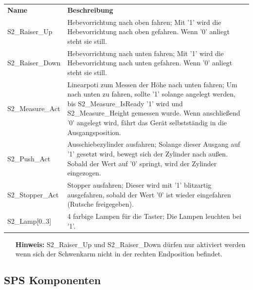 \documentclass[11pt,a4paper,ngerman]{article}
\begin{document}
\begin{center}
	\begin{tabularx}{\textwidth}{|p{4cm}|X|}
		\hline
		\rowcolor{tublau}
		\multicolumn{2}{|c|}{\bf \color{white} \large Aktoren}\\
		\hline\hline
		\rowcolor{gray!80}
		\bf Name & \bf Beschreibung\\
		\hline\hline
		S2\_Raiser\_Up & Hebevorrichtung nach oben fahren; Mit '1' wird die Hebevorrichtung nach oben gefahren. Wenn '0' anliegt steht sie still.\\
		S2\_Raiser\_Down & Hebevorrichtung nach unten fahren; Mit '1' wird die Hebevorrichtung nach unten gefahren. Wenn '0' anliegt steht sie still.\\
		S2\_Measure\_Act & Linearpoti zum Messen der Höhe nach unten fahren; Um nach unten zu fahren, sollte '1' solange angelegt werden, bis S2\_Measure\_IsReady '1' wird und S2\_Measure\_Height gemessen wurde. Wenn anschließend '0' angelegt wird, fährt das Gerät selbstständig in die Ausgangsposition.\\
		S2\_Push\_Act & Ausschiebezylinder ausfahren; Solange dieser Ausgang auf '1' gesetzt wird, bewegt sich der Zylinder nach außen. Sobald der Wert auf '0' springt, wird der Zylinder eingezogen.\\
		S2\_Stopper\_Act & Stopper ausfahren; Dieser wird mit '1' blitzartig ausgefahren, sobald der Wert '0' ist wieder eingefahren (Rutsche freigegeben).\\
		S2\_Lamp[0..3] & 4 farbige Lampen für die Taster; Die Lampen leuchten bei '1'.\\
		\hline
	\end{tabularx}
\end{center}

\begin{itemize}
	\item[\bf Hinweis:] S2\_Raiser\_Up und S2\_Raiser\_Down dürfen nur aktiviert werden wenn sich der Schwenkarm nicht in der rechten Endposition befindet.
\end{itemize}


\subsection{SPS Komponenten}
\end{document}
